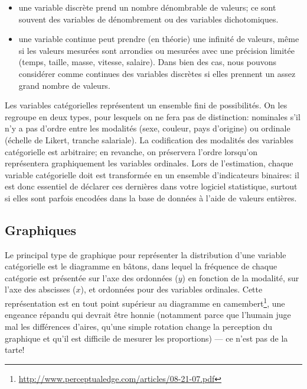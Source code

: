 \documentclass[
  11pt,
  letterpaper,
]{book}
\providecommand{\tightlist}{%
  \setlength{\itemsep}{0pt}\setlength{\parskip}{0pt}}
\renewcommand{\href}[2]{#2\footnote{\url{#1}}}
\theoremstyle{definition}
\theoremstyle{definition}
\theoremstyle{definition}
\theoremstyle{remark}
\begin{document}
\begin{itemize}
\tightlist
\item
  une variable discrète prend un nombre dénombrable de valeurs; ce sont souvent des variables de dénombrement ou des variables dichotomiques.
\item
  une variable continue peut prendre (en théorie) une infinité de valeurs, même si les valeurs mesurées sont arrondies ou mesurées avec une précision limitée (temps, taille, masse, vitesse, salaire). Dans bien des cas, nous pouvons considérer comme continues des variables discrètes si elles prennent un assez grand nombre de valeurs.
\end{itemize}

Les variables catégorielles représentent un ensemble fini de possibilités. On les regroupe en deux types, pour lesquels on ne fera pas de distinction: nominales s'il n'y a pas d'ordre entre les modalités (sexe, couleur, pays d'origine) ou ordinale (échelle de Likert, tranche salariale). La codification des modalités des variables catégorielle est arbitraire; en revanche, on préservera l'ordre lorsqu'on représentera graphiquement les variables ordinales. Lors de l'estimation, chaque variable catégorielle doit est transformée en un ensemble d'indicateurs binaires: il est donc essentiel de déclarer ces dernières dans votre logiciel statistique, surtout si elles sont parfois encodées dans la base de données à l'aide de valeurs entières.

\hypertarget{graphiques}{%
\subsection{Graphiques}\label{graphiques}}

Le principal type de graphique pour représenter la distribution d'une variable catégorielle est le diagramme en bâtons, dans lequel la fréquence de chaque catégorie est présentée sur l'axe des ordonnées (\(y\)) en fonction de la modalité, sur l'axe des abscisses (\(x\)), et ordonnées pour des variables ordinales. Cette représentation est en tout point supérieur au \href{http://www.perceptualedge.com/articles/08-21-07.pdf}{diagramme en camembert}, une engeance répandu qui devrait être honnie (notamment parce que l'humain juge mal les différences d'aires, qu'une simple rotation change la perception du graphique et qu'il est difficile de mesurer les proportions) --- ce n'est pas de la tarte!
\end{document}
